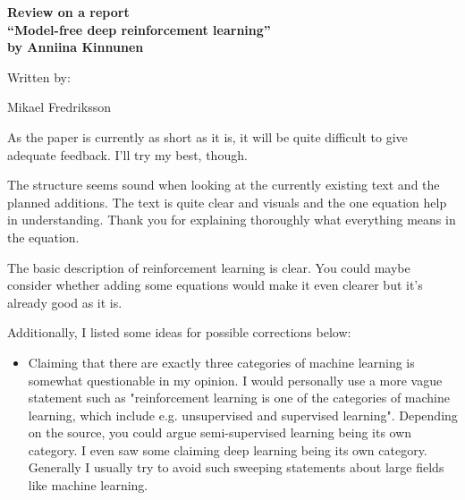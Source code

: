 \documentclass[a4paper,11pt]{article}
\begin{document}
\pagestyle{empty}


  \begin{center}
{\large {\bf 
Review on a report \\
``Model-free deep reinforcement learning'' \\
by Anniina Kinnunen} \\

\bigskip

Written by: 

Mikael Fredriksson
 } 
\end{center}

As the paper is currently as short as it is, it will be quite difficult to give 
adequate feedback. I'll try my best, though.

The structure seems sound when looking at the currently existing text and the planned
additions. The text is quite clear and visuals and the one equation help in understanding.
Thank you for explaining thoroughly what everything means in the equation.

The basic description of reinforcement learning is clear. You could maybe consider
whether adding some equations would make it even clearer but it's already good as it is.

Additionally, I listed some ideas for possible corrections below:

\begin{itemize}
	
	\item Claiming that there are exactly three categories of machine learning 
		  is somewhat questionable in my opinion. I would personally use a more
		  vague statement such as "reinforcement learning is one of the categories of
		  machine learning, which include e.g. unsupervised and supervised learning".
		  Depending on the source, you could argue semi-supervised learning being its
		  own category. I even saw some claiming deep learning being its own category.
		  Generally I usually try to avoid such sweeping statements about large
		  fields like machine learning.

\end{itemize}
\end{document}
